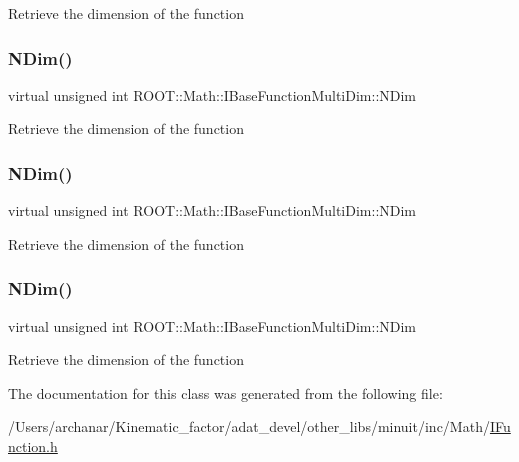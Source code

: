 Retrieve the dimension of the function \mbox{\label{classROOT_1_1Math_1_1IGradientFunctionMultiDim_af046a6f630930e59fe5356a9795aec46}} 
\subsubsection{\texorpdfstring{NDim()}{NDim()}\hspace{0.1cm}{\footnotesize\ttfamily [2/4]}}
{\footnotesize\ttfamily virtual unsigned int R\+O\+O\+T\+::\+Math\+::\+I\+Base\+Function\+Multi\+Dim\+::\+N\+Dim}

Retrieve the dimension of the function \mbox{\label{classROOT_1_1Math_1_1IGradientFunctionMultiDim_af046a6f630930e59fe5356a9795aec46}} 
\subsubsection{\texorpdfstring{NDim()}{NDim()}\hspace{0.1cm}{\footnotesize\ttfamily [3/4]}}
{\footnotesize\ttfamily virtual unsigned int R\+O\+O\+T\+::\+Math\+::\+I\+Base\+Function\+Multi\+Dim\+::\+N\+Dim}

Retrieve the dimension of the function \mbox{\label{classROOT_1_1Math_1_1IGradientFunctionMultiDim_af046a6f630930e59fe5356a9795aec46}} 
\subsubsection{\texorpdfstring{NDim()}{NDim()}\hspace{0.1cm}{\footnotesize\ttfamily [4/4]}}
{\footnotesize\ttfamily virtual unsigned int R\+O\+O\+T\+::\+Math\+::\+I\+Base\+Function\+Multi\+Dim\+::\+N\+Dim}

Retrieve the dimension of the function 

The documentation for this class was generated from the following file\+:\begin{DoxyCompactItemize}
\item 
/\+Users/archanar/\+Kinematic\+\_\+factor/adat\+\_\+devel/other\+\_\+libs/minuit/inc/\+Math/\mbox{\hyperlink{other__libs_2minuit_2inc_2Math_2IFunction_8h}{I\+Function.\+h}}\end{DoxyCompactItemize}
